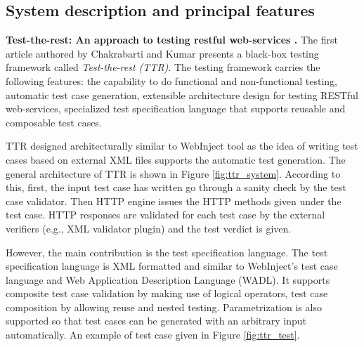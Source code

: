 \documentclass[english]{tktltiki}
\begin{document}
\subsection{System description and principal features}
\textbf{Test-the-rest: An approach to testing restful web-services \cite{chakrabarti2009test}.} The first article authored by Chakrabarti and Kumar \cite{chakrabarti2009test} presents a black-box testing framework called \textit{Test-the-rest (TTR)}. The testing framework carries the following features: the capability to do functional and non-functional testing, automatic test case generation, extensible architecture design for testing RESTful web-services, specialized test specification language that supports reusable and composable test cases.

TTR designed architecturally similar to WebInject \cite{webinject} tool as the idea of writing test cases based on external XML files supports the automatic test generation. The general architecture of TTR is shown in Figure \ref{fig:ttr_system}. According to this, first, the input test case has written go through a sanity check by the test case validator. Then HTTP engine issues the HTTP methods given under the test case. HTTP responses are validated for each test case by the external verifiers (e.g., XML validator plugin) and the test verdict is given. 

However, the main contribution is the test specification language. The test specification language is XML formatted and similar to WebInject's test case language and Web Application Description Language (WADL). It supports composite test case validation by making use of logical operators, test case composition by allowing reuse and nested testing. Parametrization is also supported so that test cases can be generated with an arbitrary input automatically. An example of test case given in Figure \ref{fig:ttr_test}.
\end{document}
